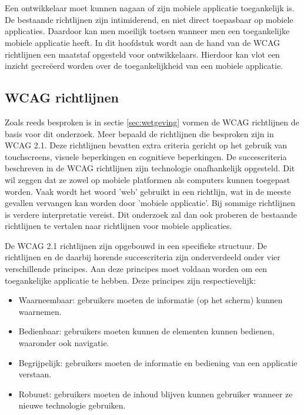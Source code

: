 \chapter{}
\label{ch:Richtlijnen voor toegankelijkheid mobiele applicaties}
Een ontwikkelaar moet kunnen nagaan of zijn mobiele applicatie toegankelijk is. De bestaande richtlijnen zijn intimiderend, en niet direct toepasbaar op mobiele applicaties. Daardoor kan men moeilijk toetsen wanneer men een toegankelijke mobiele applicatie heeft. In dit hoofdstuk wordt aan de hand van de WCAG richtlijnen een maatstaf opgesteld voor ontwikkelaars. Hierdoor kan vlot een inzicht gecreëerd worden over de toegankelijkheid van een mobiele applicatie.

\section{WCAG richtlijnen}
\label{sec:WCAGrichtlijn}

Zoals reeds besproken is in sectie \ref{sec:wetgeving} vormen de WCAG richtlijnen de basis voor dit onderzoek. Meer bepaald de richtlijnen die besproken zijn in WCAG 2.1. Deze richtlijnen bevatten extra criteria gericht op het gebruik van touchscreens, visuele beperkingen en cognitieve beperkingen.
De succescriteria beschreven in de WCAG richtlijnen zijn technologie onafhankelijk opgesteld. Dit wil zeggen dat ze zowel op mobiele platformen als computers kunnen toegepast worden\autocite{w3cTechnologyNeutral}. Vaak wordt het woord 'web' gebruikt in een richtlijn, wat in de meeste gevallen vervangen kan worden door 'mobiele applicatie'. Bij sommige richtlijnen is verdere interpretatie vereist. Dit onderzoek zal dan ook proberen de bestaande richtlijnen te vertalen naar richtlijnen voor mobiele applicaties.

De WCAG 2.1 richtlijnen zijn opgebouwd in een specifieke structuur. De richtlijnen en de daarbij horende succescriteria zijn onderverdeeld onder vier verschillende principes. Aan deze principes moet voldaan worden om een toegankelijke applicatie te hebben. Deze principes zijn respectievelijk: 
\begin{itemize}
    \item Waarneembaar: gebruikers moeten de informatie (op het scherm) kunnen waarnemen.
        \item Bedienbaar: gebruikers moeten kunnen de elementen kunnen bedienen, waaronder ook navigatie.
        \item Begrijpelijk: gebruikers moeten de informatie en bediening van een applicatie verstaan.
        \item Robuust: gebruikers moeten de inhoud blijven kunnen gebruiker wanneer ze nieuwe technologie gebruiken.
\end{itemize}

